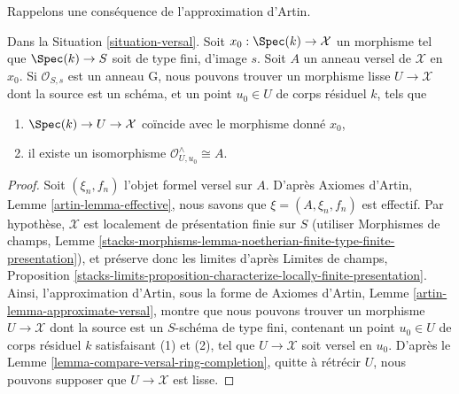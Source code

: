 \noindent
Rappelons une conséquence de l'approximation d'Artin.

\begin{lemma}
\label{lemma-Artin-approximation-by-smooth-morphism}
Dans la Situation \ref{situation-versal}. Soit $x_0 : \Spec(k) \to \mathcal{X}$
un morphisme tel que $\Spec(k) \to S$ soit de type fini, d'image $s$.
Soit $A$ un anneau versel de $\mathcal{X}$ en $x_0$.
Si $\mathcal{O}_{S, s}$ est un anneau G, nous pouvons trouver un morphisme lisse
$U \to \mathcal{X}$ dont la source est un schéma, et un point
$u_0 \in U$ de corps résiduel $k$, tels que
\begin{enumerate}
\item $\Spec(k) \to U \to \mathcal{X}$ coïncide avec le morphisme donné $x_0$,
\item il existe un isomorphisme $\mathcal{O}_{U, u_0}^\wedge \cong A$.
\end{enumerate}
\end{lemma}

\begin{proof}
Soit $(\xi_n, f_n)$ l'objet formel versel sur $A$.
D'après Axiomes d'Artin, Lemme \ref{artin-lemma-effective},
nous savons que $\xi = (A, \xi_n, f_n)$ est effectif.
Par hypothèse, $\mathcal{X}$ est localement de présentation finie sur $S$
(utiliser Morphismes de champs, Lemme
\ref{stacks-morphisms-lemma-noetherian-finite-type-finite-presentation}),
et préserve donc les limites d'après Limites de champs, Proposition
\ref{stacks-limits-proposition-characterize-locally-finite-presentation}.
Ainsi, l'approximation d'Artin, sous la forme de
Axiomes d'Artin, Lemme \ref{artin-lemma-approximate-versal},
montre que nous pouvons trouver un morphisme $U \to \mathcal{X}$ dont
la source est un $S$-schéma de type fini, contenant un point $u_0 \in U$
de corps résiduel $k$ satisfaisant (1) et (2), tel que $U \to \mathcal{X}$
soit versel en $u_0$. D'après le Lemme \ref{lemma-compare-versal-ring-completion},
quitte à rétrécir $U$, nous pouvons supposer que $U \to \mathcal{X}$ est lisse.
\end{proof}

